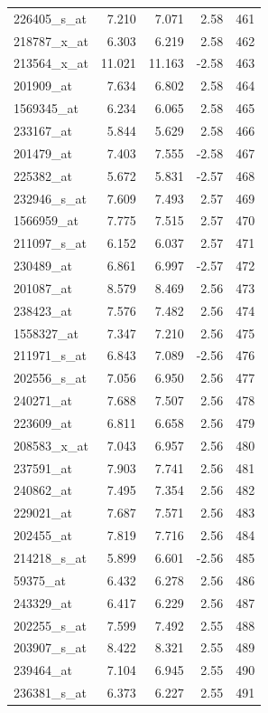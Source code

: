 \begin{footnotesize}
\begin{longtable}{lrrrr}
226405\_s\_at & 7.210 & 7.071 & 2.58 & 461 \\
218787\_x\_at & 6.303 & 6.219 & 2.58 & 462 \\
213564\_x\_at & 11.021 & 11.163 & -2.58 & 463 \\
201909\_at & 7.634 & 6.802 & 2.58 & 464 \\
1569345\_at & 6.234 & 6.065 & 2.58 & 465 \\
233167\_at & 5.844 & 5.629 & 2.58 & 466 \\
201479\_at & 7.403 & 7.555 & -2.58 & 467 \\
225382\_at & 5.672 & 5.831 & -2.57 & 468 \\
232946\_s\_at & 7.609 & 7.493 & 2.57 & 469 \\
1566959\_at & 7.775 & 7.515 & 2.57 & 470 \\
211097\_s\_at & 6.152 & 6.037 & 2.57 & 471 \\
230489\_at & 6.861 & 6.997 & -2.57 & 472 \\
201087\_at & 8.579 & 8.469 & 2.56 & 473 \\
238423\_at & 7.576 & 7.482 & 2.56 & 474 \\
1558327\_at & 7.347 & 7.210 & 2.56 & 475 \\
211971\_s\_at & 6.843 & 7.089 & -2.56 & 476 \\
202556\_s\_at & 7.056 & 6.950 & 2.56 & 477 \\
240271\_at & 7.688 & 7.507 & 2.56 & 478 \\
223609\_at & 6.811 & 6.658 & 2.56 & 479 \\
208583\_x\_at & 7.043 & 6.957 & 2.56 & 480 \\
237591\_at & 7.903 & 7.741 & 2.56 & 481 \\
240862\_at & 7.495 & 7.354 & 2.56 & 482 \\
229021\_at & 7.687 & 7.571 & 2.56 & 483 \\
202455\_at & 7.819 & 7.716 & 2.56 & 484 \\
214218\_s\_at & 5.899 & 6.601 & -2.56 & 485 \\
59375\_at & 6.432 & 6.278 & 2.56 & 486 \\
243329\_at & 6.417 & 6.229 & 2.56 & 487 \\
202255\_s\_at & 7.599 & 7.492 & 2.55 & 488 \\
203907\_s\_at & 8.422 & 8.321 & 2.55 & 489 \\
239464\_at & 7.104 & 6.945 & 2.55 & 490 \\
236381\_s\_at & 6.373 & 6.227 & 2.55 & 491 \\

\end{longtable}
\end{footnotesize}
